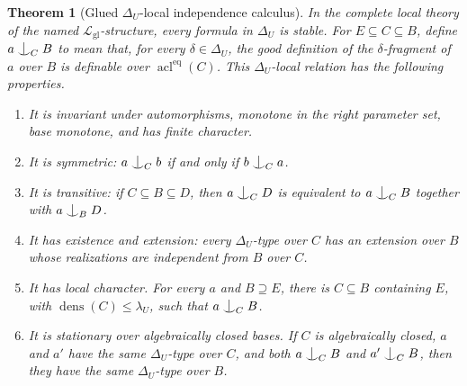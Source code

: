 \documentclass{amsart}
\newtheorem{theorem}{Theorem}[section]
\theoremstyle{definition}
\theoremstyle{remark}
\newcommand{\forkindep}[1][]{%
	\mathrel{
		\mathop{
			\vcenter{
				\hbox{\oalign{\noalign{\kern-.3ex}\hfil$\vert$\hfil\cr
						\noalign{\kern-.7ex}
						$\smile$\cr\noalign{\kern-.3ex}}}
			}
		}\displaylimits_{#1}
	}
}
\numberwithin{equation}{section}
\begin{document}
\begin{theorem}[Glued $\Delta_U$-local independence calculus]
\label{thm:glued-local-independence-calculus}
In the complete local theory of the named $\mathcal L_{\mathrm{gl}}$-structure, every formula in $\Delta_U$ is stable. For
$E\subseteq C\subseteq B$, define $a\forkindep[C]B$ to mean that,
for every $\delta\in\Delta_U$, the good definition of the
$\delta$-fragment of $a$ over $B$ is definable over
$\operatorname{acl}^{\mathrm{eq}}(C)$. This
$\Delta_U$-local relation has the following properties.
\begin{enumerate}
	\item It is invariant under automorphisms, monotone in the right
	parameter set, base monotone, and has finite character.
	
	\item It is symmetric: $a\forkindep[C]b$ if and only if
	$b\forkindep[C]a$.
	
	\item It is transitive: if $C\subseteq B\subseteq D$, then
	$a\forkindep[C]D$ is equivalent to
	$a\forkindep[C]B$ together with $a\forkindep[B]D$.
	
	\item It has existence and extension: every
	$\Delta_U$-type over $C$ has an extension over $B$ whose
	realizations are independent from $B$ over $C$.
	
	\item It has local character. For every $a$ and $B\supseteq E$,
	there is $C\subseteq B$ containing $E$, with
	$\operatorname{dens}(C)\le\lambda_U$, such that
	$a\forkindep[C]B$.
	
	\item It is stationary over algebraically closed bases. If $C$
	is algebraically closed, $a$ and $a'$ have the same
	$\Delta_U$-type over $C$, and both
	$a\forkindep[C]B$ and $a'\forkindep[C]B$, then they have the same
	$\Delta_U$-type over $B$.
\end{enumerate}
\end{theorem}
\end{document}
